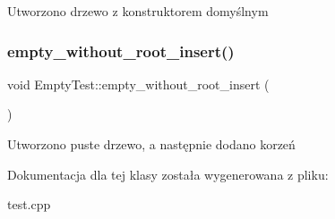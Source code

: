 Utworzono drzewo z konstruktorem domyślnym \mbox{\label{class_empty_test_ad17133b184176d9d8b0511168d13ca6b}} 
\subsubsection{\texorpdfstring{empty\+\_\+without\+\_\+root\+\_\+insert()}{empty\_without\_root\_insert()}}
{\footnotesize\ttfamily void Empty\+Test\+::empty\+\_\+without\+\_\+root\+\_\+insert (\begin{DoxyParamCaption}{ }\end{DoxyParamCaption})\hspace{0.3cm}{\ttfamily [inline]}}

Utworzono puste drzewo, a następnie dodano korzeń 

Dokumentacja dla tej klasy została wygenerowana z pliku\+:\begin{DoxyCompactItemize}
\item 
test.\+cpp\end{DoxyCompactItemize}
